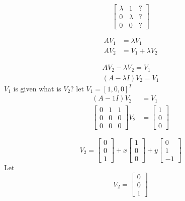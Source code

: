 \documentclass[a4paper]{article}
\begin{document}
$$
\left[\begin{array}{lll}
{\lambda} & {1} & ?\\ 
{0} & {\lambda}&  ?\\ 
{0} & {0} &? 
\end{array}\right]
$$

\begin{align*}
A V_{1}&=\lambda V_{1} \\
 A V_{2}&=V_{1}+\lambda V_{2}
\end{align*}

\begin{equation*}
\begin{array}{l}{A V_{2}-\lambda V_{2}=V_{1}} \\ {(A-\lambda I) V_{2}=V_{1}}\end{array}
\end{equation*}
$V_1$ is given what is $V_2$? let $V_1=[1,0,0]^T$
\begin{align*}
(A-1 I) V_{2}&=V_{1}\\
\left[\begin{array}{lll}{0} & {1} & {1} \\ {0} & {0} & {0} \\ {0} & {0} & {0}\end{array}\right] V_{2}&=\left[\begin{array}{l}{1} \\ {0} \\ {0}\end{array}\right]
\end{align*}

\begin{equation}
V_{2}=\left[\begin{array}{l}{0} \\ {0} \\ {1}\end{array}\right]+x\left[\begin{array}{l}{1} \\ {0} \\ {0}\end{array}\right]+y\left[\begin{array}{c}{0} \\ {1} \\ {-1}\end{array}\right]
\end{equation}
Let 
\begin{equation}
V_{2}=\left[\begin{array}{l}{0} \\ {0} \\ {1}\end{array}\right]
\end{equation}
\end{document}
